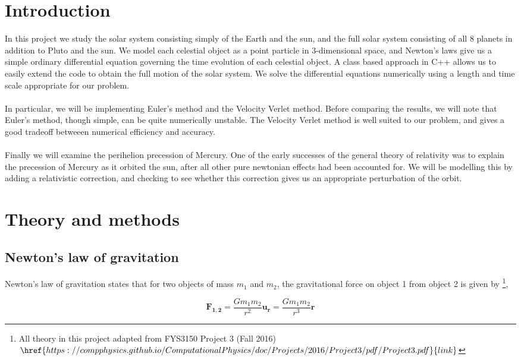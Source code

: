 \documentclass[%
 reprint,
 nobalance,
 amsmath,amssymb,
 aps,
]{revtex4-1}
\begin{document}
\section{\label{sec:Int}Introduction}
In this project we study the solar system consisting simply of the Earth and the sun, and the full solar system consisting of all 8 planets in addition to Pluto and the sun. We model each celestial object as a point particle in 3-dimensional space, and Newton's laws give us a simple ordinary differential equation governing the time evolution of each celestial object. A class based approach in C++ allows us to easily extend the code to obtain the full motion of the solar system. We solve the differential equations numerically using a length and time scale appropriate for our problem. \\ \\
In particular, we will be implementing Euler's method and the Velocity Verlet method. Before comparing the results, we will note that Euler's method, though simple, can be quite numerically unstable. The Velocity Verlet method is well suited to our problem, and gives a good tradeoff betweeen numerical efficiency and accuracy. \\ \\
Finally we will examine the perihelion precession of Mercury. One of the early successes of the general theory of relativity was to explain the precession of Mercury as it orbited the sun, after all other pure newtonian effects had been accounted for. We will be modelling this by adding a relativistic correction, and checking to see whether this correction gives us an appropriate perturbation of the orbit.

\section{\label{sec:The}Theory and methods}

\subsection{\label{sec:New}Newton's law of gravitation}
Newton's law of gravitation states that for two objects of mass $m_1$ and $m_2$, the gravitational force on object 1 from object 2 is given by \footnote{All theory in this project adapted from FYS3150 Project 3 (Fall 2016) $\href{https://compphysics.github.io/ComputationalPhysics/doc/Projects/2016/Project3/pdf/Project3.pdf}{link}$},

\begin{equation}
	\bm{F_{1,2}} = \frac{Gm_1 m_2}{r^2} \bm{u_r} = \frac{Gm_1 m_2}{r^3} \bm{r}
\end{equation}
\end{document}
